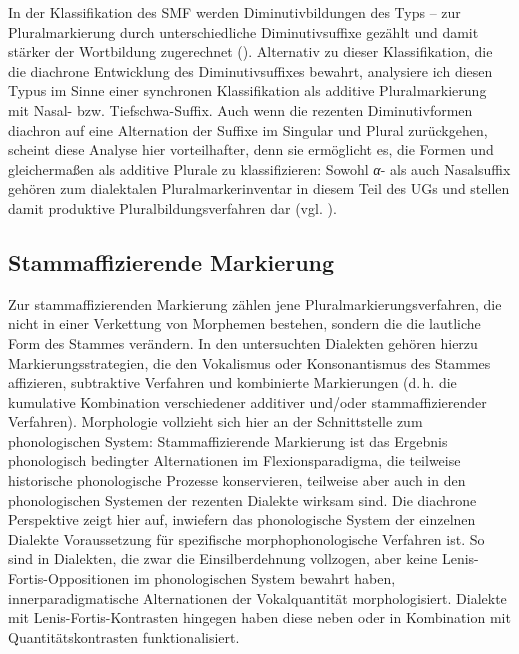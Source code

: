 \begin{sloppypar}
In der Klassifikation des SMF werden Diminutivbildungen des Typs  --  zur Pluralmarkierung durch unterschiedliche Diminutivsuffixe gezählt und damit stärker der Wortbildung zugerechnet (\citealt[204]{SMF7}). Alternativ zu dieser Klassifikation, die die diachrone Entwicklung des Diminutivsuffixes bewahrt, analysiere ich diesen Typus im Sinne einer synchronen Klassifikation als additive Pluralmarkierung mit Nasal- bzw. Tiefschwa-Suffix. Auch wenn die rezenten Diminutivformen diachron auf eine Alternation der Suffixe im Singular und Plural zurückgehen, scheint diese Analyse hier vorteilhafter, denn sie  ermöglicht es, die Formen  und  gleichermaßen als additive Plurale zu klassifizieren: Sowohl \textit{α}{}- als auch Nasalsuffix gehören zum dialektalen Pluralmarkerinventar in diesem Teil des UGs und stellen damit produktive Pluralbildungsverfahren dar (vgl. \citealt[1199]{Dingeldein1983}).
\end{sloppypar}

\subsection{Stammaffizierende Markierung}
\label{sec:7.1.2}
Zur stammaffizierenden Markierung zählen jene Pluralmarkierungsverfahren, die nicht in einer Verkettung von Morphemen bestehen, sondern die die lautliche Form des Stammes verändern. In den untersuchten Dialekten gehören hierzu Markierungsstrategien, die den Vokalismus oder Konsonantismus des Stammes affizieren, subtraktive Verfahren und kombinierte Markierungen (d.\,h. die kumulative Kombination verschiedener additiver und/oder stammaffizierender Verfahren). Morphologie vollzieht sich hier an der Schnittstelle zum phonologischen System: Stammaffizierende Markierung ist das Ergebnis phonologisch bedingter Alternationen im Flexionsparadigma, die teilweise historische phonologische Prozesse konservieren, teilweise aber auch in den phonologischen Systemen der rezenten Dialekte wirksam sind. Die diachrone Perspektive zeigt hier auf, inwiefern das phonologische System der einzelnen Dialekte Voraussetzung für spezifische morphophonologische Verfahren ist. So sind in Dialekten, die zwar die Einsilberdehnung vollzogen, aber keine Lenis-Fortis-Oppositionen im phonologischen System bewahrt haben, innerparadigmatische Alternationen der Vokalquantität morphologisiert. Dialekte mit Lenis-Fortis-Kontrasten hingegen haben diese neben oder in Kombination mit Quantitätskontrasten funktionalisiert.

